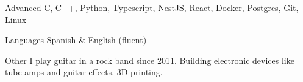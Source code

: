 
\begin{cvskills}

  \cvskill
    {Advanced}
    {C, C++, Python, Typescript, NestJS, React, Docker, Postgres, Git, Linux}

  \cvskill
    {Languages}
    {Spanish \& English (fluent)}

  \cvskill
    {Other}
    {I play guitar in a rock band since 2011. Building electronic devices like tube amps and guitar effects. 3D printing.}

\end{cvskills}
